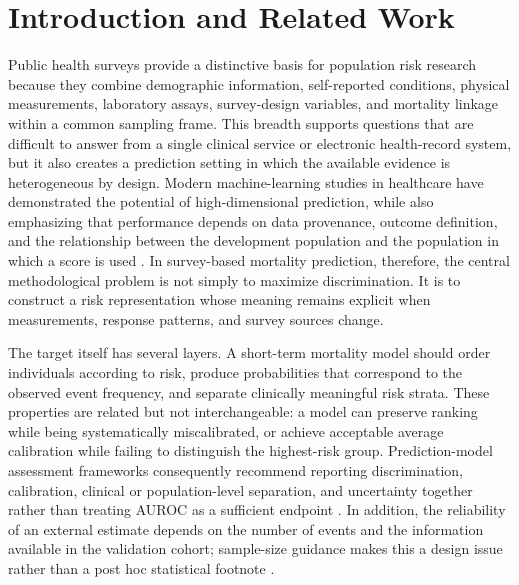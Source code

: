 \documentclass[12pt]{article}
\begin{document}
\section{Introduction and Related Work}
Public health surveys provide a distinctive basis for population risk research because they combine demographic information, self-reported conditions, physical measurements, laboratory assays, survey-design variables, and mortality linkage within a common sampling frame. This breadth supports questions that are difficult to answer from a single clinical service or electronic health-record system, but it also creates a prediction setting in which the available evidence is heterogeneous by design. Modern machine-learning studies in healthcare have demonstrated the potential of high-dimensional prediction, while also emphasizing that performance depends on data provenance, outcome definition, and the relationship between the development population and the population in which a score is used \cite{beam_2018_big_data,esteva_2019_guide,rajkomar_2018_ehr}. In survey-based mortality prediction, therefore, the central methodological problem is not simply to maximize discrimination. It is to construct a risk representation whose meaning remains explicit when measurements, response patterns, and survey sources change.

The target itself has several layers. A short-term mortality model should order individuals according to risk, produce probabilities that correspond to the observed event frequency, and separate clinically meaningful risk strata. These properties are related but not interchangeable: a model can preserve ranking while being systematically miscalibrated, or achieve acceptable average calibration while failing to distinguish the highest-risk group. Prediction-model assessment frameworks consequently recommend reporting discrimination, calibration, clinical or population-level separation, and uncertainty together rather than treating AUROC as a sufficient endpoint \cite{steyerberg_2010_prediction,van_calster_2019_calibration}. In addition, the reliability of an external estimate depends on the number of events and the information available in the validation cohort; sample-size guidance makes this a design issue rather than a post hoc statistical footnote \cite{riley_2020_sample_size,riley_2021_external_validation}.
\end{document}

